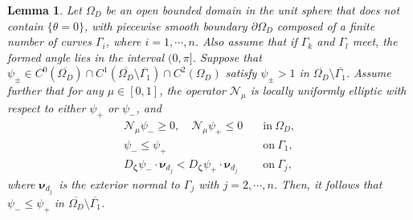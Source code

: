 \documentclass[reqno,12pt]{amsart}
\newtheorem{lemma}{Lemma}[section]
\numberwithin{equation}{section}
\begin{document}
\begin{lemma}\label{lemma: comparison principle}
Let $\Omega_{D}$ be an open bounded domain in the unit sphere that does not contain $\{\theta=0\}$, with piecewise smooth boundary $\partial\Omega_D$ composed of a finite number of curves $\Gamma_i$, where $i=1,\cdots,n$. Also assume that if $\Gamma_k$ and $\Gamma_l$ meet, the formed angle lies in the interval $(0,\pi]$. Suppose that ${\psi}_{\pm}\in C^{0}(\overline{\Omega_{D}})\cap C^{1}(\overline{\Omega_{D}}\setminus\overline{\Gamma_1})\cap C^2(\Omega_{D})$ satisfy ${\psi}_{\pm}>1$ in $\overline{\Omega_{D}}\setminus\overline{\Gamma_1}$. Assume further that for any $\mu\in [0,1]$, the operator $\mathcal{N}_\mu$ is locally uniformly elliptic with respect to either ${\psi}_{+}$ or $\psi_-$, and
	\begin{align*}
	\mathcal{N}_\mu\psi_-\geq0, \quad\mathcal{N}_\mu\psi_+\leq0\quad&\text{in}~\Omega_{D},\\
   \psi_-\leq\psi_+\quad&\text{on}~\Gamma_1,\\
     D_{\bm{\zeta}}\psi_-\cdot\bm{\nu}_{d_j}<D_{\bm{\zeta}}\psi_+\cdot\bm{\nu}_{d_j}\quad&\text{on}~\Gamma_j,
	\end{align*}
where $\bm{\nu}_{d_j}$~is the exterior normal to $\Gamma_j$ with $j=2,\cdots,n$. Then, it follows that ${\psi}_{-}\leq{\psi}_{+}$ in $\overline{\Omega_{D}}\setminus\overline{\Gamma_1}$.
\end{lemma}
\end{document}
